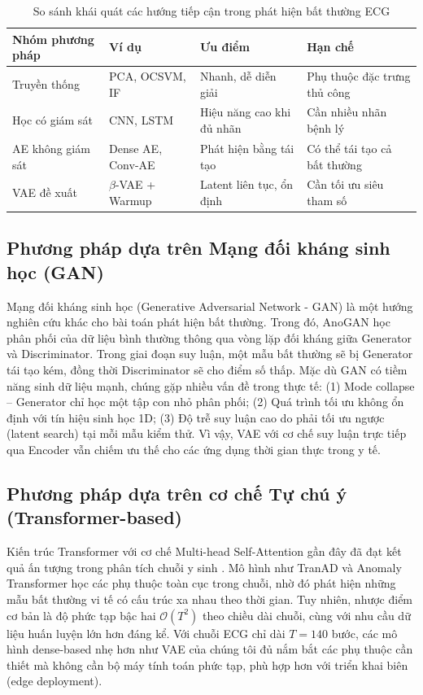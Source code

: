 \documentclass[conference]{IEEEtran}
\begin{document}
\begin{table}[htbp]
\caption{So sánh khái quát các hướng tiếp cận trong phát hiện bất thường ECG}
\centering
\begin{tabularx}{\columnwidth}{>{\raggedright\arraybackslash}p{} >{\raggedright\arraybackslash}p{} >{\raggedright\arraybackslash}p{} >{\raggedright\arraybackslash}p{}}
\toprule
\textbf{Nhóm phương pháp} & \textbf{Ví dụ} & \textbf{Ưu điểm} & \textbf{Hạn chế} \\
\midrule
Truyền thống & PCA, OCSVM, IF & Nhanh, dễ diễn giải & Phụ thuộc đặc trưng thủ công \\
Học có giám sát & CNN, LSTM & Hiệu năng cao khi đủ nhãn & Cần nhiều nhãn bệnh lý \\
AE không giám sát & Dense AE, Conv-AE & Phát hiện bằng tái tạo & Có thể tái tạo cả bất thường \\
VAE đề xuất & \(\beta\)-VAE + Warmup & Latent liên tục, ổn định & Cần tối ưu siêu tham số \\
\bottomrule
\end{tabularx}
\label{tab:relatedwork}
\end{table}

\subsection{Phương pháp dựa trên Mạng đối kháng sinh học (GAN)}
Mạng đối kháng sinh học (Generative Adversarial Network - GAN) \cite{kingma} là một hướng nghiên cứu khác cho bài toán phát hiện bất thường. Trong đó, AnoGAN \cite{ancho} học phân phối của dữ liệu bình thường thông qua vòng lặp đối kháng giữa Generator và Discriminator. Trong giai đoạn suy luận, một mẫu bất thường sẽ bị Generator tái tạo kém, đồng thời Discriminator sẽ cho điểm số thấp. Mặc dù GAN có tiềm năng sinh dữ liệu mạnh, chúng gặp nhiều vấn đề trong thực tế: (1) Mode collapse -- Generator chỉ học một tập con nhỏ phân phối; (2) Quá trình tối ưu không ổn định với tín hiệu sinh học 1D; (3) Độ trễ suy luận cao do phải tối ưu ngược (latent search) tại mỗi mẫu kiểm thử. Vì vậy, VAE với cơ chế suy luận trực tiếp qua Encoder vẫn chiếm ưu thế cho các ứng dụng thời gian thực trong y tế.

\subsection{Phương pháp dựa trên cơ chế Tự chú ý (Transformer-based)}
Kiến trúc Transformer với cơ chế Multi-head Self-Attention gần đây đã đạt kết quả ấn tượng trong phân tích chuỗi y sinh \cite{chalapathy}. Mô hình như TranAD và Anomaly Transformer học các phụ thuộc toàn cục trong chuỗi, nhờ đó phát hiện những mẫu bất thường vi tế có cấu trúc xa nhau theo thời gian. Tuy nhiên, nhược điểm cơ bản là độ phức tạp bậc hai $\mathcal{O}(T^2)$ theo chiều dài chuỗi, cùng với nhu cầu dữ liệu huấn luyện lớn hơn đáng kể. Với chuỗi ECG chỉ dài $T=140$ bước, các mô hình dense-based nhẹ hơn như VAE của chúng tôi đủ nắm bắt các phụ thuộc cần thiết mà không cần bộ máy tính toán phức tạp, phù hợp hơn với triển khai biên (edge deployment).
\end{document}
